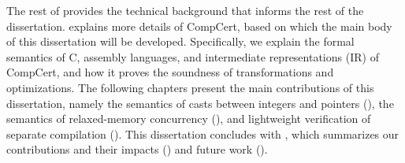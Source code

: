 The rest of  provides the technical background that informs the rest of the
dissertation.   explains more details of CompCert, based on which the main body
of this dissertation will be developed.  Specifically, we explain the formal semantics of C,
assembly languages, and intermediate representations (IR) of CompCert, and how it proves the
soundness of transformations and optimizations.  The following chapters present the main
contributions of this dissertation, namely the semantics of casts between integers and pointers
(), the semantics of relaxed-memory concurrency (), and
lightweight verification of separate compilation ().  This dissertation concludes
with , which summarizes our contributions and their impacts
() and future work ().


%


